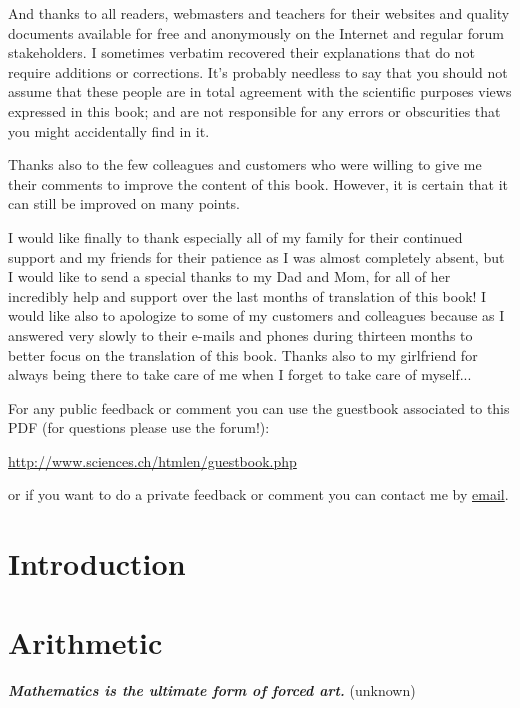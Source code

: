 \documentclass[12pt,a4paper,twoside,openright]{report}
\theoremstyle{definition}
\theoremstyle{itexmp}
\numberwithin{equation}{section}
\begin{document}
	And thanks to all readers, webmasters and teachers for their websites and quality documents available for free and anonymously on the Internet and regular forum stakeholders. I sometimes verbatim recovered their explanations that do not require additions or corrections. It's probably needless to say that you should not assume that these people are in total agreement with the scientific purposes views expressed in this book; and are not responsible for any errors or obscurities that you might accidentally find in it.
	
	Thanks also to the few colleagues and customers who were willing to give me their comments to improve the content of this book. However, it is certain that it can still be improved on many points.
	
	I would like finally to thank especially all of my family for their continued support and my friends for their patience as I was almost completely absent, but I would like to send a special thanks to my Dad and Mom, for all of her incredibly help and support over the last months of translation of this book! I would like also to apologize to some of my customers and colleagues because as I answered very slowly to their e-mails and phones during thirteen months to better focus on the translation of this book. Thanks also to my girlfriend for always being there to take care of me when I forget to take care of myself...
	
	For any public feedback or comment you can use the guestbook associated to this PDF (for questions please use the forum!):
	\begin{center}
	\url{http://www.sciences.ch/htmlen/guestbook.php}
	\end{center}
	or if you want to do a private feedback or comment you can contact me by {\href{mailto:info@sciences.ch}{{\color{blue}email}}}.
	
\chapter{Introduction}
	
	\minitoc
	\pagebreak
	
	

\chapter{Arithmetic}

	\textit{\textbf{Mathematics is the ultimate form of forced art.}} (unknown)
	\minitoc
	
	
\end{document}
